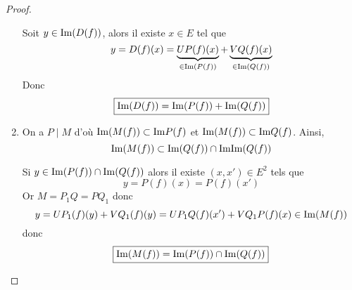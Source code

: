 \documentclass[12pt]{article}
\begin{document}
\begin{proof}
\begin{enumerate}
		Soit $y\in\mathrm{Im}(D(f))$, alors il existe $x\in E$ tel que 
		\begin{equation}
			y=D(f)(x)=\underbrace{UP(f)(x)}_{\in\mathrm{Im}(P(f))}+\underbrace{VQ(f)(x)}_{\in\mathrm{Im}(Q(f))}
		\end{equation}
		Donc 
		\begin{equation}
			\boxed{\mathrm{Im}(D(f))=\mathrm{Im}(P(f))+\mathrm{Im}(Q(f))}
		\end{equation}

		\item On a $P\mid M$ d'où $\mathrm{Im}(M(f))\subset\mathrm{Im} P(f)$ et $\mathrm{Im}(M(f))\subset\mathrm{Im} Q(f)$. Ainsi,
		\begin{equation}
			\mathrm{Im}(M(f))\subset\mathrm{Im}(Q(f))\cap\mathrm{Im}\mathrm{Im}(Q(f))
		\end{equation}

		Si $y\in\mathrm{Im}(P(f))\cap\mathrm{Im}(Q(f))$ alors il existe $(x,x')\in E^{2}$ tels que 
		\begin{equation}
			y=P(f)(x)=P(f)(x')
		\end{equation}
		Or $M=P_{1}Q=PQ_{1}$ donc 
		\begin{equation}
			y=UP_{1}(f)(y)+VQ_{1}(f)(y)=UP_{1}Q(f)(x')+VQ_{1}P(f)(x)\in\mathrm{Im}(M(f))
		\end{equation}
		donc 
		\begin{equation}
			\boxed{\mathrm{Im}(M(f))=\mathrm{Im}(P(f))\cap\mathrm{Im}(Q(f))}
		\end{equation}
	\end{enumerate}
\end{proof}
\end{document}

